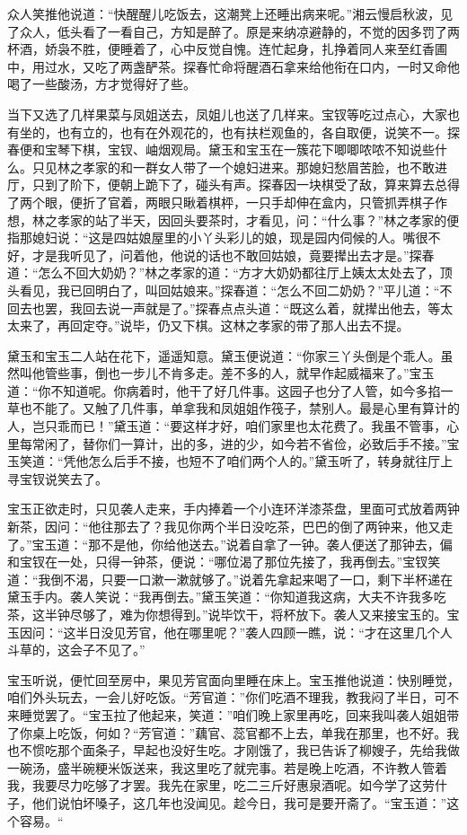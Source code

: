 \documentclass[12pt,oneside]{book}
\begin{document}
众人笑推他说道：“快醒醒儿吃饭去，这潮凳上还睡出病来呢。”湘云慢启秋波，见了众人，低头看了一看自己，方知是醉了。原是来纳凉避静的，不觉的因多罚了两杯酒，娇袅不胜，便睡着了，心中反觉自愧。连忙起身，扎挣着同人来至红香圃中，用过水，又吃了两盏酽茶。探春忙命将醒酒石拿来给他衔在口内，一时又命他喝了一些酸汤，方才觉得好了些。

当下又选了几样果菜与凤姐送去，凤姐儿也送了几样来。宝钗等吃过点心，大家也有坐的，也有立的，也有在外观花的，也有扶栏观鱼的，各自取便，说笑不一。探春便和宝琴下棋，宝钗、岫烟观局。黛玉和宝玉在一簇花下唧唧哝哝不知说些什么。只见林之孝家的和一群女人带了一个媳妇进来。那媳妇愁眉苦脸，也不敢进厅，只到了阶下，便朝上跪下了，碰头有声。探春因一块棋受了敌，算来算去总得了两个眼，便折了官着，两眼只瞅着棋枰，一只手却伸在盒内，只管抓弄棋子作想，林之孝家的站了半天，因回头要茶时，才看见，问：“什么事？”林之孝家的便指那媳妇说：“这是四姑娘屋里的小丫头彩儿的娘，现是园内伺候的人。嘴很不好，才是我听见了，问着他，他说的话也不敢回姑娘，竟要撵出去才是。”探春道：“怎么不回大奶奶？”林之孝家的道：“方才大奶奶都往厅上姨太太处去了，顶头看见，我已回明白了，叫回姑娘来。”探春道：“怎么不回二奶奶？”平儿道：“不回去也罢，我回去说一声就是了。”探春点点头道：“既这么着，就撵出他去，等太太来了，再回定夺。”说毕，仍又下棋。这林之孝家的带了那人出去不提。

黛玉和宝玉二人站在花下，遥遥知意。黛玉便说道：“你家三丫头倒是个乖人。虽然叫他管些事，倒也一步儿不肯多走。差不多的人，就早作起威福来了。”宝玉道：“你不知道呢。你病着时，他干了好几件事。这园子也分了人管，如今多掐一草也不能了。又触了几件事，单拿我和凤姐姐作筏子，禁别人。最是心里有算计的人，岂只乖而已！”黛玉道：“要这样才好，咱们家里也太花费了。我虽不管事，心里每常闲了，替你们一算计，出的多，进的少，如今若不省俭，必致后手不接。”宝玉笑道：“凭他怎么后手不接，也短不了咱们两个人的。”黛玉听了，转身就往厅上寻宝钗说笑去了。

宝玉正欲走时，只见袭人走来，手内捧着一个小连环洋漆茶盘，里面可式放着两钟新茶，因问：“他往那去了？我见你两个半日没吃茶，巴巴的倒了两钟来，他又走了。”宝玉道：“那不是他，你给他送去。”说着自拿了一钟。袭人便送了那钟去，偏和宝钗在一处，只得一钟茶，便说：“哪位渴了那位先接了，我再倒去。”宝钗笑道：“我倒不渴，只要一口漱一漱就够了。”说着先拿起来喝了一口，剩下半杯递在黛玉手内。袭人笑说：“我再倒去。”黛玉笑道：“你知道我这病，大夫不许我多吃茶，这半钟尽够了，难为你想得到。”说毕饮干，将杯放下。袭人又来接宝玉的。宝玉因问：“这半日没见芳官，他在哪里呢？”袭人四顾一瞧，说：“才在这里几个人斗草的，这会子不见了。”

宝玉听说，便忙回至房中，果见芳官面向里睡在床上。宝玉推他说道：快别睡觉，咱们外头玩去，一会儿好吃饭。“芳官道：”你们吃酒不理我，教我闷了半日，可不来睡觉罢了。“宝玉拉了他起来，笑道：”咱们晚上家里再吃，回来我叫袭人姐姐带了你桌上吃饭，何如？“芳官道：”藕官、蕊官都不上去，单我在那里，也不好。我也不惯吃那个面条子，早起也没好生吃。才刚饿了，我已告诉了柳嫂子，先给我做一碗汤，盛半碗粳米饭送来，我这里吃了就完事。若是晚上吃酒，不许教人管着我，我要尽力吃够了才罢。我先在家里，吃二三斤好惠泉酒呢。如今学了这劳什子，他们说怕坏嗓子，这几年也没闻见。趁今日，我可是要开斋了。“宝玉道：”这个容易。“
\end{document}
